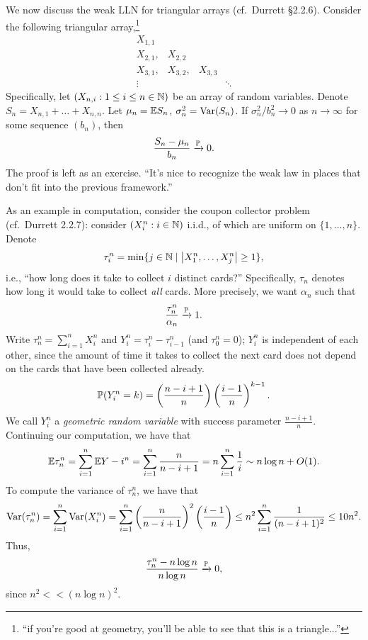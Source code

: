 We now discuss the weak LLN for triangular arrays (cf.\ Durrett \S2.2.6). Consider the following triangular array,\footnote{``if you're good at geometry, you'll be able to see that this is a triangle...''}
\[ \begin{array}{cccc} X_{1,1} \\ X_{2,1}, & X_{2,2} \\ X_{3,1}, & X_{3,2}, & X_{3,3} \\ \vdots & & & \ddots \end{array} \]
Specifically, let $(X_{n,i} : 1 \leq i \leq n \in \mathbb N)$ be an array of random variables. Denote $S_n = X_{n,1} + \dots + X_{n,n}$. Let $\mu_n = \mathbb E S_n$, $\sigma_n^2 = \operatorname{Var}(S_n)$. If $\sigma_n^2/b_n^2 \to 0$ as $n \to \infty$ for some sequence $(b_n)$, then
\[ \frac{S_n - \mu_n}{b_n} \xrightarrow{\mathbb P} 0. \]
The proof is left as an exercise. {\color{airforceblue} ``It's nice to recognize the weak law in places that don't fit into the previous framework.''}

As an example in computation, consider the coupon collector problem (cf.\ Durrett 2.2.7): consider $(X_i^n : i \in \mathbb N)$ i.i.d., of which are uniform on $\{1, \dots, n\}$. Denote
\[ \tau_i^n = \min\{j \in \mathbb N \mid \left\lvert X_1^n, \dots, X_j^n \right\rvert \geq 1\}, \]
i.e., ``how long does it take to collect $i$ distinct cards?'' Specifically, $\tau_n$ denotes how long it would take to collect \textit{all} cards. More precisely, we want $\alpha_n$ such that
\[ \frac{\tau_n^n}{\alpha_n} \xrightarrow{\mathbb P} 1. \]
Write $\tau_n^n = \sum_{i=1}^n X_i^n$ and $Y_i^n = \tau_i^n - \tau_{i-1}^n$ (and $\tau_0^n = 0$); $Y_i^n$ is independent of each other, since the amount of time it takes to collect the next card does not depend on the cards that have been collected already.
\[ \mathbb P(Y_i^n = k) = \left(\frac{n - i +1}{n}\right) \left(\frac{i - 1}{n}\right)^{k-1}. \]
We call $Y_i^n$ a \textit{geometric random variable} with success parameter $\frac{n-i+1}{n}$. Continuing our computation, we have that
\[ \mathbb E \tau_n^n = \sum_{i=1}^n \mathbb E Y-i^n = \sum_{i=1}^n \frac{n}{n-i+1} = n \sum_{i=1}^n \frac{1}{i} \sim n \log n + O(1). \]
To compute the variance of $\tau_n^n$, we have that
\[ \operatorname{Var}(\tau_n^n) = \sum_{i=1}^n \operatorname{Var}(X_i^n) = \sum_{i=1}^n \left(\frac{n}{n-i+1}\right)^2 \left(\frac{i-1}{n}\right) \leq n^2 \sum_{i=1}^n \frac{1}{(n - i + 1)^2} \leq 10n^2. \]
Thus,
\[ \frac{\tau_n^n - n \log n}{n \log n} \xrightarrow{\mathbb P} 0, \]
since $n^2 <\!\!< (n \log n)^2$.